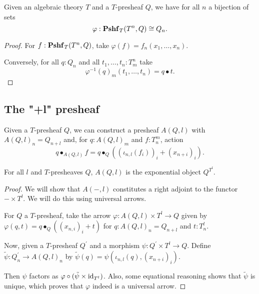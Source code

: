 \begin{lemma}\label{lem:presheaf-Yoneda}
  Given an algebraic theory $ T $ and a $ T $-presheaf $ Q $, we have for all $ n $ a bijection of sets
  \[ \varphi: \mathbf{Pshf}_{T}(T^n, Q) \cong Q_n. \]
\end{lemma}
\begin{proof}
  For $ f: \mathbf{Pshf}_{T}(T^n, Q) $, take $ \varphi(f) = f_n(x_1, \dots, x_n) $.

  Conversely, for all $ q: Q_n $ and all $ t_1, \dots, t_n: T_m^n $ take
  \[ \varphi^{-1}(q)_m(t_1, \dots, t_n) = q \bullet t. \]
\end{proof}

\subsection{The "+l" presheaf}

\begin{example}
  Given a $ T $-presheaf $ Q $, we can construct a presheaf $ A(Q, l) $ with $ A(Q, l)_n = Q_{n + l} $ and, for $ q: A(Q, l)_m $ and $ f: T_n^m $, action
  \[ q \bullet_{A(Q, l)} f = q \bullet_Q ((\iota_{n, l} (f_i))_i + (x_{n + i})_i). \]
\end{example}

\begin{lemma}
  For all $ l $ and $ T $-presheaves $ Q $, $ A(Q, l) $ is the exponential object $ Q^{T^l} $.
\end{lemma}
\begin{proof}
  We will show that $ A(-, l) $ constitutes a right adjoint to the functor $ - \times T^l $. We will do this using universal arrows.

  For $ Q $ a $ T $-presheaf, take the arrow $ \varphi: A(Q, l) \times T^l \to Q $ given by $ \varphi(q, t) = q \bullet_Q ((x_{n, i})_i + t) $ for $ q: A(Q, l)_n = Q_{n + l} $ and $ t: T^l_n $.

  Now, given a $ T $-presheaf $ Q^\prime $ and a morphism $ \psi: Q^\prime \times T^l \to Q $. Define $ \tilde \psi: Q^\prime_n \to A(Q, l)_n $ by $ \tilde \psi(q) = \psi(\iota_{n, l}(q), (x_{n + i})_i) $.

  Then $ \psi $ factors as $ \varphi \circ (\tilde \psi \times \text{id}_{T^l}) $. Also, some equational reasoning shows that $ \tilde \psi $ is unique, which proves that $ \varphi $ indeed is a universal arrow.
\end{proof}
